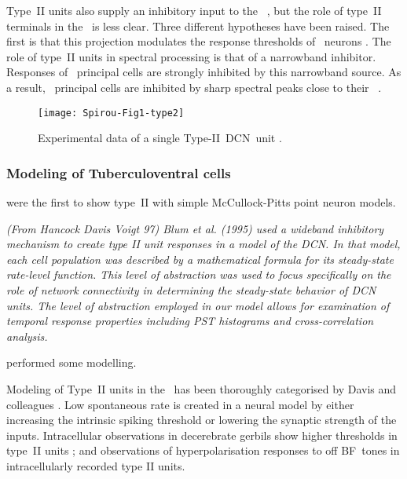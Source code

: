 
Type~II units also supply an inhibitory input to the \VCN~\citep{WickesbergOertel:1990}, but the role of type~II terminals in the \VCN~is less clear.
Three different hypotheses have been raised.
The first is that this projection modulates the response thresholds of \VCN~neurons \citep{PaoliniClark:1998}.
The role of type~II units in spectral processing is that of a narrowband inhibitor. Responses of \DCN~principal cells are strongly inhibited by this narrowband source.
As a result, \DCN~principal cells are inhibited by sharp spectral peaks close to their \BF~\citep{SpirouDavisEtAl:1999}.


\begin{figure}[htb]
  \centering
  \texttt{[image: Spirou-Fig1-type2]}
  \caption[Experimental data of a single Type-II~DCN~unit]{Experimental data of a single Type-II~DCN~unit \citep[Fig.~1]{SpirouDavisEtAl:1999}.}   \label{fig:SpirouFig1}
\end{figure}


\subsubsection{Modeling of Tuberculoventral cells}



\citet{ArleKim:1991a} were the first to show type~II \EIRA  with simple McCullock-Pitts point neuron models.


{\it (From Hancock Davis Voigt 97) Blum et al. (1995) used a wideband inhibitory   mechanism to create type II unit responses in a model of the DCN. In that   model, each cell population was described by a mathematical formula for its   steady-state rate-level function. This level of abstraction was used to focus   specifically on the role of network connectivity in determining the   steady-state behavior of DCN units. The level of abstraction employed in our   model allows for examination of temporal response properties including PST   histograms and cross-correlation analysis.}

\citep{DunnVetterEtAl:1996} performed some modelling.


Modeling of Type~II units in the \DCN~has been thoroughly categorised by Davis and colleagues \citep{YoungDavis:2002,HancockDavisEtAl:2001,DavisYoung:2000,SpirouDavisEtAl:1999,HancockDavisEtAl:1997,DavisVoigt:1996,DavisVoigt:1994,DavisVoigt:1991}.
 Low spontaneous rate is created in a neural model by either increasing the intrinsic spiking threshold or lowering the synaptic strength of the inputs.
Intracellular observations in decerebrate gerbils show higher thresholds in type~II units \citep{DingVoigt:1997}; and observations of hyperpolarisation responses to off \gls{BF}~tones in intracellularly recorded type II units.

